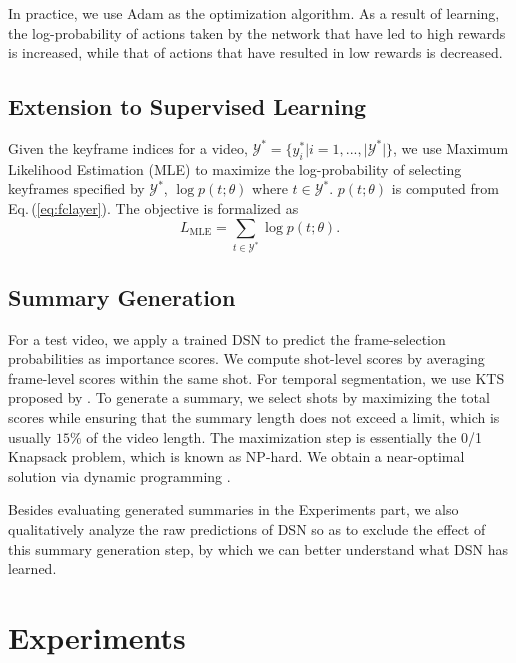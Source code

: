 \documentclass[letterpaper]{article} \usepackage{aaai18}  \usepackage{times}  \usepackage{helvet}  \usepackage{courier}  \usepackage{url}  \usepackage{graphicx}
\begin{document}
In practice, we use Adam \cite{kingma2014adam} as the optimization algorithm. As a result of learning, the log-probability of actions taken by the network that have led to high rewards is increased, while that of actions that have resulted in low rewards is decreased.

\subsection{Extension to Supervised Learning}
Given the keyframe indices for a video, $\mathcal{Y}^* = \{ y^*_i | i = 1, ..., |\mathcal{Y}^*| \}$, we use Maximum Likelihood Estimation (MLE) to maximize the log-probability of selecting keyframes specified by $\mathcal{Y}^*$, $\log p(t; \theta)$ where $t \in \mathcal{Y}^*$. $p(t; \theta)$ is computed from Eq.\,(\ref{eq:fclayer}). The objective is formalized as
\begin{equation} \label{eq:supervisedmle}
L_\text{MLE} = \sum_{t \in \mathcal{Y}^*} \log p(t; \theta).
\end{equation}

\subsection{Summary Generation}
For a test video, we apply a trained DSN to predict the frame-selection probabilities as importance scores. We compute shot-level scores by averaging frame-level scores within the same shot. For temporal segmentation, we use KTS proposed by \cite{potapov2014category}. To generate a summary, we select shots by maximizing the total scores while ensuring that the summary length does not exceed a limit, which is usually $15\%$ of the video length. The maximization step is essentially the 0/1 Knapsack problem, which is known as NP-hard. We obtain a near-optimal solution via dynamic programming \cite{song2015tvsum}.

Besides evaluating generated summaries in the Experiments part, we also qualitatively analyze the raw predictions of DSN so as to exclude the effect of this summary generation step, by which we can better understand what DSN has learned.


\section{Experiments}
\end{document}

